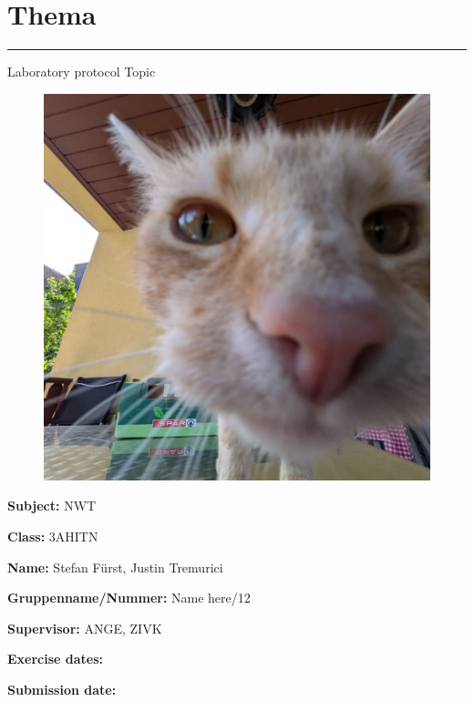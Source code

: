 \documentclass[a4paper]{article}
\newcommand{\abc}{\hfill \break}
\begin{document}

\pagestyle{oida}
\section*{Thema}
\par\noindent\rule{\textwidth}{0.4pt}

Laboratory protocol
Topic

\begin{figure}[h]
	\includegraphics[scale=0.2]{images/mika.jpeg}
	\centering
\end{figure}

\vspace*{\fill}
\textbf{Subject:}	NWT\abc

\textbf{Class:}	3AHITN\abc

\textbf{Name:}	Stefan Fürst, Justin Tremurici\abc

\textbf{Gruppenname/Nummer:} Name here/12\abc

\textbf{Supervisor:} 	ANGE, ZIVK\abc

\textbf{Exercise dates:}	\abc

\textbf{Submission date:}\abc

\abc \abc \abc \abc

\newpage
\tableofcontents

\newpage
\end{document}
